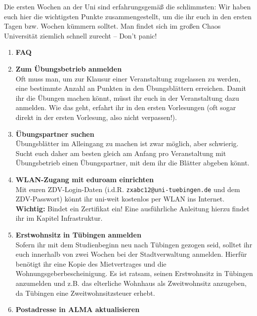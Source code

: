 
Die ersten Wochen an der Uni sind erfahrungsgemäß die schlimmsten: Wir haben euch hier die wichtigsten Punkte zusammengestellt, um die ihr euch in den ersten Tagen bzw. Wochen kümmern solltet. Man findet sich im großen Chaos Universität ziemlich schnell zurecht -- Don't panic!
  
  \begin{enumerate}[label=$\bigcirc$]
  	
  	\item \textbf{FAQ} \\
	\item \textbf{Zum Übungsbetrieb anmelden} \\
	  	Oft muss man, um zur Klausur einer Veranstaltung zugelassen zu werden, eine bestimmte Anzahl an Punkten in den Übungsblättern erreichen. Damit ihr die Übungen machen könnt, müsst ihr euch in der Veranstaltung dazu anmelden. Wie das geht, erfahrt ihr in den ersten Vorlesungen (oft sogar direkt in der ersten Vorlesung, also nicht verpassen!).
  	\item \textbf{Übungspartner suchen} \\
	  	Übungsblätter im Alleingang zu machen ist zwar möglich, aber schwierig. Sucht euch daher am besten gleich am Anfang pro Veranstaltung mit Übungsbetrieb einen Übungspartner, mit dem ihr die Blätter abgeben könnt.
  	\item \textbf{WLAN-Zugang mit eduroam einrichten}\\
	  	Mit euren ZDV-Login-Daten (i.d.R. \texttt{zxabc12@uni-tuebingen.de} und dem ZDV-Passwort) könnt ihr uni-weit kostenlos per WLAN ins Internet. \textbf{Wichtig:} Bindet ein Zertifikat ein! Eine ausführliche Anleitung hierzu findet ihr im Kapitel Infrastruktur.
  	\item \textbf{Erstwohnsitz in Tübingen anmelden} \\
	  	Sofern ihr mit dem Studienbeginn neu nach Tübingen gezogen seid, solltet ihr euch innerhalb von zwei Wochen bei der Stadtverwaltung anmelden. Hierfür benötigt ihr eine Kopie des Mietvertrages und die Wohnungsgeberbescheinigung. Es ist ratsam, seinen Erstwohnsitz in Tübingen anzumelden und z.B. das elterliche Wohnhaus als Zweitwohnsitz anzugeben, da Tübingen eine Zweitwohnsitzsteuer erhebt.
	\item \textbf{Postadresse in ALMA aktualisieren}\\

\end{enumerate}
